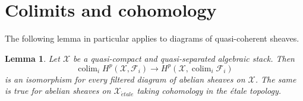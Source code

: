\documentclass{stacks-project}
\theoremstyle{plain}
\newtheorem{lemma}[subsection]{Lemma}
\theoremstyle{definition}
\theoremstyle{remark}
\numberwithin{equation}{subsection}
\def\colim{\mathop{\mathrm{colim}}\nolimits}
\def\etale{{\acute{e}tale}}
\begin{document}
\section{Colimits and cohomology}
\label{section-colimits}

\noindent
The following lemma in particular applies to diagrams of quasi-coherent
sheaves.

\begin{lemma}
\label{lemma-colimits}
Let $\mathcal{X}$ be a quasi-compact and quasi-separated algebraic stack.
Then
$$
\colim_i H^p(\mathcal{X}, \mathcal{F}_i)
\longrightarrow
H^p(\mathcal{X}, \colim_i \mathcal{F}_i)
$$
is an isomorphism for every filtered diagram of abelian sheaves on
$\mathcal{X}$. The same is true for abelian sheaves on $\mathcal{X}_\etale$
taking cohomology in the \'etale topology.
\end{lemma}
\end{document}
